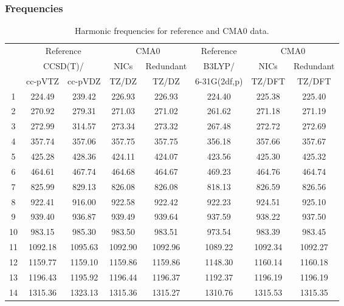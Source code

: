 \documentclass[10pt,oneside]{article}
\begin{document}
\begin{table}[h!]
\subsubsection*{Frequencies}
\centering
\caption{Harmonic frequencies for reference and CMA0 data.}
\begin{tabular}{cccccccc}
\toprule
{} & \multicolumn{2}{c}{Reference} & \multicolumn{2}{c}{CMA0} &    Reference & \multicolumn{2}{c}{CMA0} \\
{} & \multicolumn{2}{c}{CCSD(T)/} &    NICs &  Redundant &       B3LYP/ &    NICs & Redundant \\
{} &   cc-pVTZ & cc-pVDZ &   TZ/DZ &      TZ/DZ & 6-31G(2df,p) &  TZ/DFT &    TZ/DFT \\
\midrule
1  &    224.49 &  239.42 &  226.93 &     226.93 &       224.40 &  225.38 &    225.40 \\
2  &    270.92 &  279.31 &  271.03 &     271.02 &       261.62 &  271.18 &    271.19 \\
3  &    272.99 &  314.57 &  273.34 &     273.32 &       267.48 &  272.72 &    272.69 \\
4  &    357.74 &  357.06 &  357.75 &     357.75 &       356.18 &  357.66 &    357.67 \\
5  &    425.28 &  428.36 &  424.11 &     424.07 &       423.56 &  425.30 &    425.32 \\
6  &    464.61 &  467.74 &  464.68 &     464.67 &       469.23 &  464.76 &    464.74 \\
7  &    825.99 &  829.13 &  826.08 &     826.08 &       818.13 &  826.59 &    826.56 \\
8  &    922.41 &  916.00 &  922.58 &     922.42 &       922.23 &  924.51 &    925.10 \\
9  &    939.40 &  936.87 &  939.49 &     939.64 &       937.59 &  938.22 &    937.50 \\
10 &    983.15 &  985.30 &  983.50 &     983.51 &       973.54 &  983.39 &    983.45 \\
11 &   1092.18 & 1095.63 & 1092.90 &    1092.96 &      1089.22 & 1092.34 &   1092.27 \\
12 &   1159.77 & 1159.10 & 1159.86 &    1159.86 &      1148.30 & 1160.14 &   1160.18 \\
13 &   1196.43 & 1195.92 & 1196.44 &    1196.37 &      1192.37 & 1196.19 &   1196.19 \\
14 &   1315.36 & 1323.13 & 1315.36 &    1315.27 &      1310.76 & 1315.53 &   1315.35 \\

\end{tabular}
\end{table}
\end{document}
